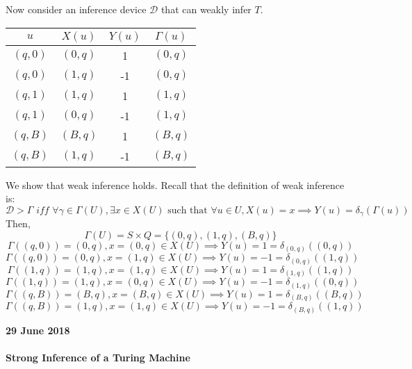 \documentclass[11pt]{article}
\begin{document}
Now consider an inference device $ \mathcal{D} $ that can weakly infer $ T $.

\begin{center}
\begin{tabular}{ c||c|c|c } 



 $ u $ & $ X(u) $ & $ Y(u) $ & $ \Gamma(u) $ \\ 
 \hline
 \hline
 $ (q, 0) $ & $ (0, q) $ & 1 & $ (0, q) $ \\ 
 \hline
 $ (q, 0) $ & $ (1, q) $ & -1 & $ (0, q) $ \\ 
 \hline
 $ (q, 1) $ & $ (1, q) $ & 1 & $ (1, q) $ \\ 
 \hline
 $ (q, 1) $ & $ (0, q) $ & -1 & $ (1, q) $ \\ 
 \hline
 $ (q, B) $ & $ (B, q) $ & 1 & $ (B, q) $ \\ 
 \hline
 $ (q, B) $ & $ (1, q) $ & -1 & $ (B, q) $ \\ 
 
\end{tabular}
\end{center}

We show that weak inference holds. Recall that the definition of weak inference is:
$$ \mathcal{D} > \Gamma \textit{ iff } \forall \gamma \in \Gamma(U), \exists x \in X(U) \text{ such that } \forall u \in U, X(u) = x \implies Y(u) = \delta_{\gamma}(\Gamma(u)) $$  
Then, 
$$ \Gamma(U) = S \times Q = \{(0, q), (1, q), (B, q)\} $$
$$ \Gamma((q, 0)) = (0, q), x = (0, q) \in X(U) \implies Y(u) = 1 = \delta_{(0, q)}((0, q)) $$
$$ \Gamma((q, 0)) = (0, q), x = (1, q) \in X(U) \implies Y(u) = -1 = \delta_{(0, q)}((1, q)) $$ 
$$ \Gamma((1, q)) = (1, q), x = (1, q) \in X(U) \implies Y(u) = 1 = \delta_{(1, q)}((1, q)) $$ 
$$ \Gamma((1, q)) = (1, q), x = (0, q) \in X(U) \implies Y(u) = -1 = \delta_{(1, q)}((0, q)) $$ 
$$ \Gamma((q, B)) = (B, q), x = (B, q) \in X(U) \implies Y(u) = 1 = \delta_{(B, q)}((B, q)) $$ 
$$ \Gamma((q, B)) = (1, q), x = (1, q) \in X(U) \implies Y(u) = -1 = \delta_{(B, q)}((1, q)) $$ 

\bigbreak

\textbf{29 June 2018} \\ 
\\

\textbf{Strong Inference of a Turing Machine} \\
\end{document}
